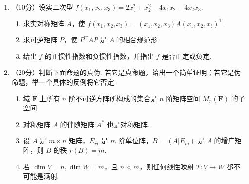 \begin{enumerate}
\begin{enumerate}
        \item 证明 $E_m-AB$ 是可逆矩阵当且仅当 $E_n-BA$ 是可逆矩阵($E_m$ 是 $m$ 阶单位矩阵，$E_n$ 是 $n$ 阶单位矩阵).
    \end{enumerate}

    \item （10分）设实二次型 $f(x_1,x_2,x_3) = 2x_1^2+x_2^2-4x_1x_2-4x_2x_3$.
    \begin{enumerate}
        \item 求实对称矩阵 $A$，使 $f(x_1,x_2,x_3)=(x_1,x_2,x_3)A(x_1,x_2,x_3)^{\mathrm{T}}$.

        \item 求可逆矩阵 $P$，使 $P^\mathrm{T}AP$ 是 $A$ 的相合规范形.

        \item 给出 $f$ 的正惯性指数和负惯性指数，并指出 $f$ 是否正定或负定.
    \end{enumerate}

    \item （20分）判断下面命题的真伪. 若它是真命题，给出一个简单证明；若它是伪命题，举一个具体的反例将它否定.
    \begin{enumerate}
        \item 域 $\mathbf{F}$ 上所有 $n$ 阶不可逆方阵所构成的集合是 $n$ 阶矩阵空间 $M_n(\mathbf{F})$ 的子空间.

        \item 对称矩阵 $A$ 的伴随矩阵 $A^*$ 也是对称矩阵.

        \item 设 $A$ 是 $m\times n$ 矩阵，$E_m$ 是 $m$ 阶单位阵，$B=(A|E_m)$ 是 $A$ 的增广矩阵，则 $B$ 的秩 $r(B)=m$.

        \item 若 $\dim V = n,\dim W = m$，且 $n < m$，则任何线性映射 $T\colon V\to W$ 都不可能是满射.
    \end{enumerate}
\end{enumerate}

\clearpage
